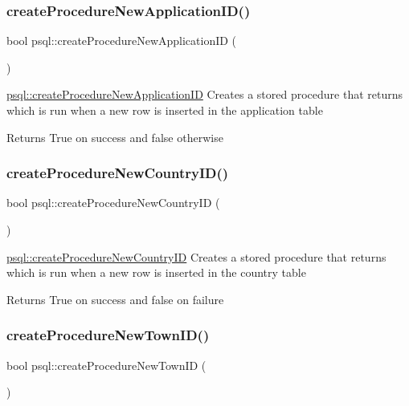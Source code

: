 \subsubsection{\texorpdfstring{createProcedureNewApplicationID()}{createProcedureNewApplicationID()}}
{\footnotesize\ttfamily bool psql\+::create\+Procedure\+New\+Application\+ID (\begin{DoxyParamCaption}{ }\end{DoxyParamCaption})}



\mbox{\hyperlink{classpsql_ae9e3ee06f4a5ecd4178662dfa0655fe1}{psql\+::create\+Procedure\+New\+Application\+ID}} Creates a stored procedure that returns which is run when a new row is inserted in the application table 

\begin{DoxyReturn}{Returns}
True on success and false otherwise 
\end{DoxyReturn}
\mbox{\label{classpsql_a565bfc828ecb6b5621354128773494fd}} 
\subsubsection{\texorpdfstring{createProcedureNewCountryID()}{createProcedureNewCountryID()}}
{\footnotesize\ttfamily bool psql\+::create\+Procedure\+New\+Country\+ID (\begin{DoxyParamCaption}{ }\end{DoxyParamCaption})}



\mbox{\hyperlink{classpsql_a565bfc828ecb6b5621354128773494fd}{psql\+::create\+Procedure\+New\+Country\+ID}} Creates a stored procedure that returns which is run when a new row is inserted in the country table 

\begin{DoxyReturn}{Returns}
True on success and false on failure 
\end{DoxyReturn}
\mbox{\label{classpsql_ade0c7fa4f019c3f349230af09b1de49e}} 
\subsubsection{\texorpdfstring{createProcedureNewTownID()}{createProcedureNewTownID()}}
{\footnotesize\ttfamily bool psql\+::create\+Procedure\+New\+Town\+ID (\begin{DoxyParamCaption}{ }\end{DoxyParamCaption})}



